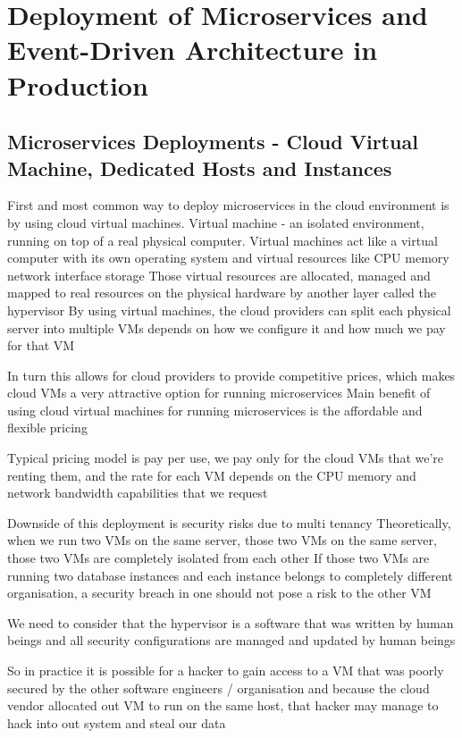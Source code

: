 \section{Deployment of Microservices and Event-Driven Architecture in Production}

\subsection{Microservices Deployments - Cloud Virtual Machine, Dedicated Hosts and Instances}
First and most common way to deploy microservices in the cloud environment is by using cloud virtual machines.
Virtual machine - an isolated environment, running on top of a real physical computer.
Virtual machines act like a virtual computer with its own operating system and virtual resources like CPU memory network interface storage
Those virtual resources are allocated, managed and mapped to real resources on the physical hardware by another layer called the hypervisor
By using virtual machines, the cloud providers can split each physical server into multiple VMs depends on how we configure it and how much we pay for that VM

In turn this allows for cloud providers to provide competitive prices, which makes cloud VMs a very attractive option for running microservices
Main benefit of using cloud virtual machines for running microservices is the affordable and flexible pricing

Typical pricing model is pay per use, we pay only for the cloud VMs that we're renting them, and the rate for each VM depends on the CPU memory and network bandwidth capabilities that we request

Downside of this deployment is security risks due to multi tenancy
Theoretically, when we run two VMs on the same server, those two VMs on the same server, those two VMs are completely isolated from each other
If those two VMs are running two database instances and each instance belongs to completely different organisation, a security breach in one should not pose a risk to the other VM

We need to consider that the hypervisor is a software that was written by human beings and all security configurations are managed and updated by human beings

So in practice it is possible for a hacker to gain access to a VM that was poorly secured by the other software engineers / organisation and because the cloud vendor allocated out VM to run on the same host, that hacker may manage to hack into out system and steal our data

